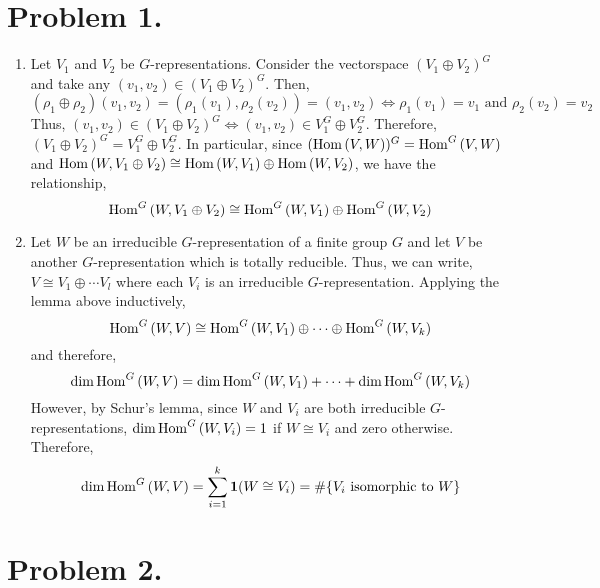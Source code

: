 \documentclass[12pt]{extarticle}
\begin{document}

\section*{Problem 1.}

\begin{enumerate}
\item Let $V_1$ and $V_2$ be $G$-representations. Consider the vectorspace $(V_1 \oplus V_2)^G$ and take any $(v_1, v_2) \in (V_1 \oplus V_2)^G$. Then,
\[(\rho_1 \oplus \rho_2) (v_1, v_2) = (\rho_1(v_1), \rho_2(v_2)) = (v_1, v_2) \iff \rho_1(v_1) = v_1 \text{ and } \rho_2(v_2) = v_2\]
Thus, $(v_1, v_2) \in (V_1 \oplus V_2)^G \iff (v_1, v_2) \in V_1^G \oplus V_2^G$. Therefore, $(V_1 \oplus V_2)^G = V_1^G \oplus V_2^G$. In particular, since $(\mathrm{Hom}\left( V, W \right))^G = \mathrm{Hom}^{G} \left( V, W \right)$ and $\mathrm{Hom}\left( W, V_1 \oplus V_2 \right) \cong \mathrm{Hom}\left( W, V_1 \right) \oplus \mathrm{Hom}\left( W, V_2 \right)$, we have the relationship,
\[ \mathrm{Hom}^{G} \left( W, V_1 \oplus V_2 \right) \cong \mathrm{Hom}^{G} \left( W, V_1 \right) \oplus \mathrm{Hom}^{G} \left( W, V_2 \right)\]  

\item  Let $W$ be an irreducible $G$-representation of a finite group $G$ and let $V$ be another $G$-representation which is totally reducible. Thus, we can write, $V \cong V_1 \oplus \cdots V_l$ where each $V_i$ is an irreducible $G$-representation. Applying the lemma above inductively,
\[ \mathrm{Hom}^{G} \left( W, V \right) \cong \mathrm{Hom}^{G} \left( W, V_1 \right) \oplus \cdots \oplus \mathrm{Hom}^{G} \left( W, V_k \right) \]
and therefore, 
\[ \dim{\mathrm{Hom}^{G} \left( W, V \right)} = \dim{\mathrm{Hom}^{G} \left( W, V_1 \right)} + \cdots + \dim{\mathrm{Hom}^{G} \left( W, V_k \right)} \]
However, by Schur's lemma, since $W$ and $V_i$ are both irreducible $G$-representations, $\dim{\mathrm{Hom}^{G} \left( W, V_i \right)} = 1$ if $W \cong V_i$ and zero otherwise. Therefore,
\[ \dim{\mathrm{Hom}^{G} \left( W, V \right)} = \sum_{i = 1}^k \mathbf{1}(W \cong V_i)
= \#\{V_i \text{ isomorphic to } W\} \]
  
\end{enumerate}

\section*{Problem 2.}
\end{document}
